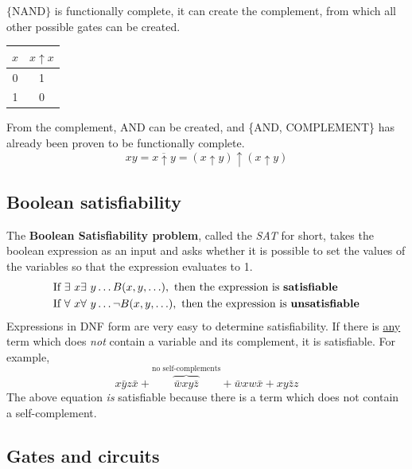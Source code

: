 $\{\text{NAND}\}$ is functionally complete, it can create the complement,
from which all other possible gates can be created.
\begin{center}
  \begin{tabular}{c|c}
    $x$ & $x \uparrow x$ \\
    \hline
    0   & 1              \\
    1   & 0
  \end{tabular}
\end{center}
From the complement, AND can be created, and \{AND, COMPLEMENT\} has already been proven to be functionally complete.
\[
  xy = \overline{x \uparrow y} = (x \uparrow y) \uparrow (x \uparrow y)
\]

\subsection{Boolean satisfiability}

The \textbf{Boolean Satisfiability problem}, called the \textit{SAT} for short,
takes the boolean expression as an input and asks whether it is possible to set the values of the variables
so that the expression evaluates to 1.
\begin{align*}
  \text{If } & \exists~ x \exists~ y \ldots B(x, y, \ldots), \text{ then the expression is \textbf{satisfiable}}         \\
  \text{If } & \forall~ x \forall~ y \ldots \lnot B(x, y, \ldots), \text{ then the expression is \textbf{unsatisfiable}} \\
\end{align*}
Expressions in DNF form are very easy to determine satisfiability.
If there is \underline{any} term which does \textit{not} contain a variable and its complement,
it is satisfiable. For example,
\[
  x\bar{y}z\bar{x} + \overbrace{\bar{w}xy\bar{z}}^\text{no self-complements} + \bar{w}xw\bar{x} + xy\bar{z}z
\]
The above equation \textit{is} satisfiable because there is a term which does not contain a self-complement.

\subsection{Gates and circuits}

